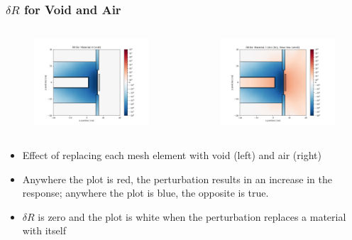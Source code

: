 \documentclass[t]{beamer}
\begin{document}
\begin{frame}
  \frametitle{$\delta R$ for Void and Air}
  \vskip-0.3in
  \begin{columns}
    \begin{figure}
      \includegraphics[trim={0.7in 0.15in 1.05in 0.4in},clip,scale=0.36]{images/dR_00.png}
    \end{figure}
    \begin{figure}
      \includegraphics[trim={0.7in 0.15in 1.05in 0.4in},clip,scale=0.36]{images/dR_01.png}
    \end{figure}
  \end{columns}
  \begin{itemize}
    \item Effect of replacing each mesh element with void (left) and air (right)
    \item Anywhere the plot is red, the perturbation results in an increase in
          the response; anywhere the plot is blue, the opposite is true.
    \item $\delta R$ is zero and the plot is white when the perturbation
          replaces a material with itself
  \end{itemize}
\end{frame}
\end{document}
